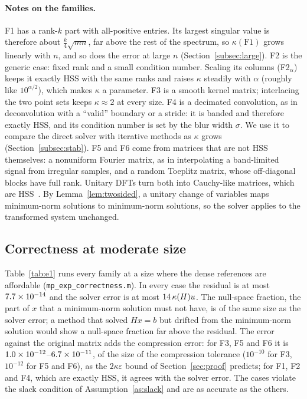 \paragraph{Notes on the families.}
F1 has a rank-$k$ part with all-positive entries. Its largest singular value is therefore about
$\tfrac k4\sqrt{mn}$, far above the rest of the spectrum, so $\kappa(\mathrm{F1})$ grows linearly with $n$,
and so does the error at large $n$ (Section~\ref{subsec:large}). F2 is the generic case: fixed rank and
a small condition number. Scaling its columns (F2$_\alpha$) keeps it exactly HSS with the same ranks and raises
$\kappa$ steadily with $\alpha$ (roughly like $10^{\alpha/2}$), which makes $\kappa$ a parameter. F3 is a smooth kernel matrix;
interlacing the two point sets keeps $\kappa\approx2$ at every size. F4 is a decimated convolution, as in
deconvolution with a ``valid'' boundary or a stride: it is banded and therefore exactly HSS, and its
condition number is set by the blur width $\sigma$. We use it to compare the direct solver with
iterative methods as $\kappa$ grows (Section~\ref{subsec:stab}). F5 and F6 come from matrices that are not
HSS themselves: a nonuniform Fourier matrix, as in interpolating a band-limited signal from irregular
samples, and a random Toeplitz matrix, whose off-diagonal blocks have full rank. Unitary DFTs turn both
into Cauchy-like matrices, which are HSS~\cite{gko}. By Lemma~\ref{lem:twosided}, a unitary change of
variables maps minimum-norm solutions to minimum-norm solutions, so the solver applies to the transformed
system unchanged.

\subsection{Correctness at moderate size}\label{subsec:correct}
Table~\ref{tab:e1} runs every family at a size where the dense references are affordable
(\texttt{mp\_exp\_correctness.m}). In every case the residual is at most $7.7\times10^{-14}$ and the solver error is at most
$14\,\kappa(H)u$\EoneSmallKappaClause. The null-space fraction, the part of $x$ that a minimum-norm solution
must not have, is of the same size as the solver error; a method that solved $Hx=b$ but drifted from the
minimum-norm solution would show a null-space fraction far above the residual. The error against the
original matrix adds the compression error: for F3, F5 and F6 it is $1.0\times10^{-12}$--$6.7\times10^{-11}$, of
the size of the compression tolerance ($10^{-10}$ for F3, $10^{-12}$ for F5 and F6), as the
$2\kappa\varepsilon$ bound of Section~\ref{sec:proof} predicts; for F1, F2 and F4, which are exactly HSS, it
agrees with the solver error.
The cases \EoneNoSlack{} violate the slack condition of Assumption~\ref{as:slack} and are as accurate as
the others.

